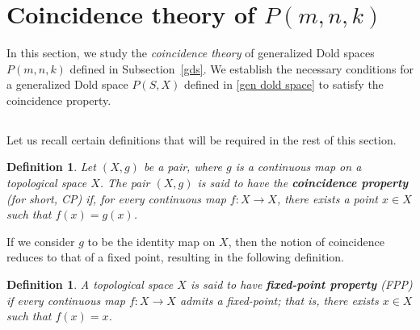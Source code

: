 \documentclass{amsart}
\newtheorem{definition}[theorem]{Definition}
\newcommand{\subsecref}[1]{Subsection~\ref{#1}}
\begin{document}
	
	
	
	
	
	\section{Coincidence theory of $P(m,n,k)$} \label{section 4}
	In this section, we study the \textit{coincidence theory} of generalized Dold %
spaces $P(m,n,k)$ defined in \subsecref{gds}. We establish the necessary conditions for a %
generalized Dold space $P(S,X)$ defined in \eqref{gen dold space} to satisfy the coincidence property. 
	
	\subsection{} Let us recall certain definitions that will be required in the rest of this section.
	
	\begin{definition}
		Let $(X,g)$ be a pair, where $g$ is a continuous map on a topological space $X$. The pair $(X,g)$ is said to have the %
\textbf{coincidence property} (for short, %
CP) if, for every continuous map $f : X \to X$, there exists a point $x \in X$ such that $f(x) = g(x)$.
	\end{definition}
	
	If we consider $g$ to be the identity map on $X$, then the notion of coincidence reduces to that of a fixed point, resulting %
in the following definition.
	
	
	
	\begin{definition}
		A %
topological space $X$ is said to have \textbf{fixed-point property} (FPP) if every continuous map $f : X \to X$ admits a fixed-point; that is, there exists $x \in X$ such that $f(x) = x$.
	\end{definition}
	
\end{document}
